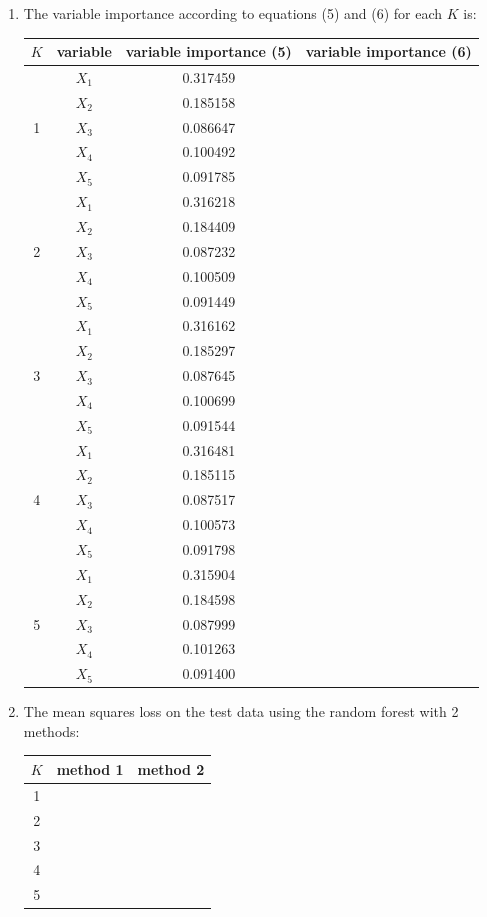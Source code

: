 \documentclass[paper=letter, fontsize=12pt]{article}
\begin{document}
\begin{enumerate}[label=(\alph*)]
\begin{enumerate}[label=(\roman*)]
		\item The variable importance according to equations (5) and (6) for each $K$ is:
		
		\begin{longtable}{|c|c|c|c|}
			\hline
			$K$ & variable & variable importance (5) & variable importance (6) \\ \hline
			\multirow{5}{1em}{1} & $X_1$ & 0.317459 & \\ 
			& $X_2$ & 0.185158 & \\
			& $X_3$ & 0.086647 & \\
			& $X_4$ & 0.100492 & \\
			& $X_5$ & 0.091785 & \\
			\hline
			\multirow{5}{1em}{2} & $X_1$ & 0.316218 & \\ 
			& $X_2$ & 0.184409 & \\
			& $X_3$ & 0.087232 & \\
			& $X_4$ & 0.100509 & \\
			& $X_5$ & 0.091449 & \\
			\hline
			\multirow{5}{1em}{3} & $X_1$ & 0.316162 & \\ 
			& $X_2$ & 0.185297 & \\
			& $X_3$ & 0.087645 & \\
			& $X_4$ & 0.100699 & \\
			& $X_5$ & 0.091544 & \\
			\hline
			\multirow{5}{1em}{4} & $X_1$ & 0.316481 & \\ 
			& $X_2$ & 0.185115 & \\
			& $X_3$ & 0.087517 & \\
			& $X_4$ & 0.100573 & \\
			& $X_5$ & 0.091798 & \\
			\hline
			\multirow{5}{1em}{5} & $X_1$ & 0.315904 & \\ 
			& $X_2$ & 0.184598 & \\
			& $X_3$ & 0.087999 &\\
			& $X_4$ & 0.101263 & \\
			& $X_5$ & 0.091400 & \\
			\hline
		\end{longtable}
		
		
		\item The mean squares loss on the test data using the random forest with 2 methods:
		
		\begin{center}
			\begin{tabular}{|c|c|c|}
				\hline
				$K$ & method 1 & method 2 \\ \hline
				1 &  & \\ \hline
				2 &  & \\ \hline
				3 &  & \\ \hline
				4 &  & \\ \hline
				5 &  & \\ \hline
			\end{tabular}
		\end{center}
		

\end{enumerate}
\end{enumerate}
\end{document}
